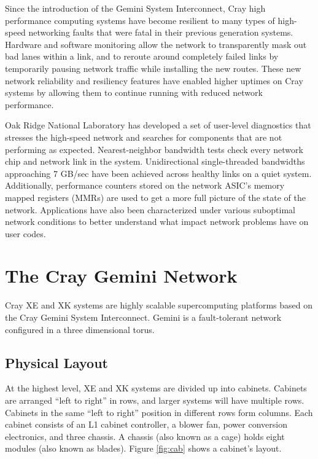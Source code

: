 \documentclass[10pt, conference, compsocconf]{IEEEtran}
\begin{document}
Since the introduction of the Gemini System Interconnect, Cray high performance
computing systems have become resilient to many types of high-speed networking
faults that were fatal in their previous generation systems. Hardware and
software monitoring allow the network to transparently mask out bad lanes
within a link, and to reroute around completely failed links by temporarily
pausing network traffic while installing the new routes. These new network
reliability and resiliency features have enabled higher uptimes on Cray systems
by allowing them to continue running with reduced network performance.

Oak Ridge National Laboratory has developed a set of user-level diagnostics
that stresses the high-speed network and searches for components that are not
performing as expected. Nearest-neighbor bandwidth tests check every network
chip and network link in the system. Unidirectional single-threaded bandwidths
approaching 7 GB/sec have been achieved across healthy links on a quiet system.
Additionally, performance counters stored on the network ASIC's memory mapped
registers (MMRs) are used to get a more full picture of the state of the
network. Applications have also been characterized under various suboptimal
network conditions to better understand what impact network problems have on
user codes.

\section{The Cray Gemini Network}

Cray XE and XK systems are highly scalable supercomputing platforms based on
the Cray Gemini System Interconnect.  Gemini is a fault-tolerant network
configured in a three dimensional torus.

\subsection{Physical Layout}

At the highest level, XE and XK systems are divided up into cabinets.  Cabinets
are arranged ``left to right'' in rows, and larger systems will have multiple
rows.  Cabinets in the same ``left to right'' position in different rows form
columns.  Each cabinet consists of an L1 cabinet controller, a blower fan,
power conversion electronics, and three chassis.  A chassis (also known as a
cage) holds eight modules (also known as blades).  Figure \ref{fig:cab} shows a
cabinet's layout.
\end{document}
